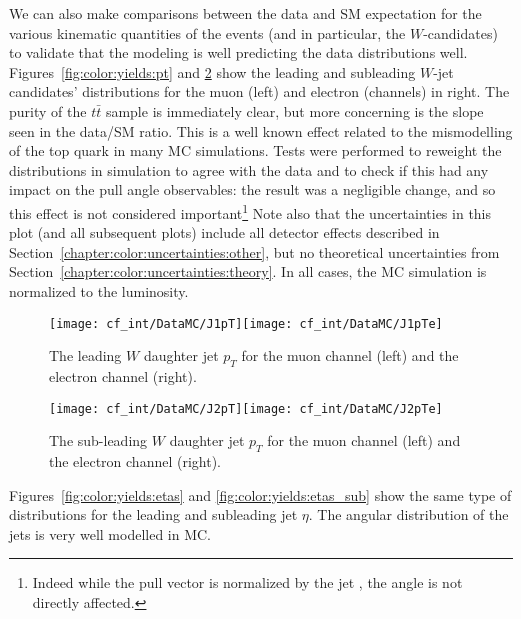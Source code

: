 We can also make comparisons between the data and SM expectation for the various kinematic quantities of the events (and in particular, the $W$-candidates) to validate that the modeling is well predicting the data distributions well. Figures~\ref{fig:color:yields:pt} and \ref{fig:color:yields:pts_sub} show the leading and subleading $W$-jet candidates' \pt distributions for the muon (left) and electron (channels) in right. The purity of the $t\bar{t}$ sample is immediately clear, but more concerning is the slope seen in the data/SM ratio. This is a well known effect related to the mismodelling of the top quark \pt in many MC simulations. Tests were performed to reweight the \pt distributions in simulation to agree with the data and to check if this had any impact on the pull angle observables: the result was a negligible change, and so this effect is not considered important\footnote{Indeed while the pull vector is normalized by the jet \pt, the angle is not directly affected.} Note also that the uncertainties in this plot (and all subsequent plots) include all detector effects described in Section~\ref{chapter:color:uncertainties:other}, but no theoretical uncertainties from Section~\ref{chapter:color:uncertainties:theory}. In all cases, the MC simulation is normalized to the luminosity.


\begin{figure}[h!]
\begin{center}
\texttt{[image: cf\_int/DataMC/J1pT]}\texttt{[image: cf\_int/DataMC/J1pTe]}
 \caption{The leading $W$ daughter jet $p_T$ for the muon channel (left) and the electron channel (right).}
 \label{fig:color:yields:pts}
  \end{center}
\end{figure}

\begin{figure}[h!]
\begin{center}
\texttt{[image: cf\_int/DataMC/J2pT]}\texttt{[image: cf\_int/DataMC/J2pTe]}
 \caption{The sub-leading $W$ daughter jet $p_T$ for the muon channel (left) and the electron channel (right).}
 \label{fig:color:yields:pts_sub}
  \end{center}
\end{figure}



Figures~\ref{fig:color:yields:etas} and \ref{fig:color:yields:etas_sub} show the same type of distributions for the leading and subleading jet $\eta$. The angular distribution of the jets is very well modelled in MC.

